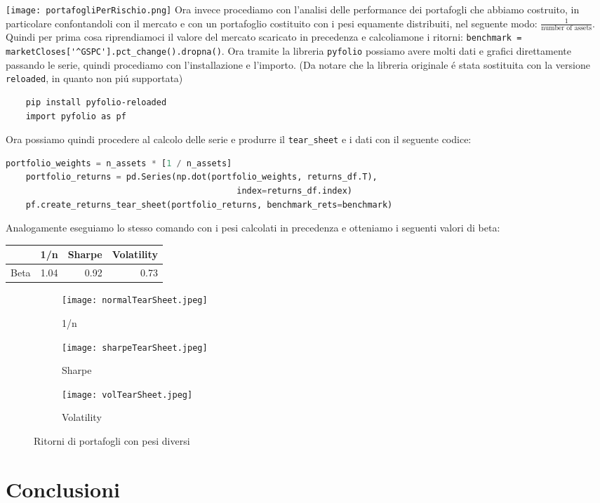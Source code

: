 \documentclass{report}
\begin{document}
\texttt{[image: portafogliPerRischio.png]}
Ora invece procediamo con l'analisi delle performance dei portafogli che abbiamo costruito, in particolare confontandoli con il mercato e con un portafoglio costituito con i pesi equamente distribuiti, nel seguente modo:  \(\frac{1}{\text{number of assets}}\). Quindi per prima cosa riprendiamoci il valore del mercato scaricato in precedenza e calcoliamone i ritorni: \lstinline{benchmark = marketCloses['^GSPC'].pct_change().dropna()}. Ora tramite la libreria \lstinline{pyfolio} possiamo avere molti dati e grafici direttamente passando le serie, quindi procediamo con l'installazione e l'importo. (Da notare che la libreria originale é stata sostituita con la versione \lstinline{reloaded}, in quanto non piú supportata)
\begin{lstlisting}
    pip install pyfolio-reloaded
    import pyfolio as pf
\end{lstlisting}
Ora possiamo quindi procedere al calcolo delle serie e produrre il \lstinline{tear_sheet} e i dati con il seguente codice:
\begin{lstlisting}[language=python]
    portfolio_weights = n_assets * [1 / n_assets]
    portfolio_returns = pd.Series(np.dot(portfolio_weights, returns_df.T),
                                              index=returns_df.index)
    pf.create_returns_tear_sheet(portfolio_returns, benchmark_rets=benchmark)
\end{lstlisting}
 Analogamente eseguiamo lo stesso comando con i pesi calcolati in precedenza
 e otteniamo i seguenti valori di beta:

\begin{tabular}{lrrr}
\toprule
{} &     1/n &     Sharpe &      Volatility \\
\midrule
Beta &  1.04 &  0.92 &  0.73 \\

\bottomrule
\end{tabular}

\begin{figure}[h]

\begin{subfigure}{0.5\textwidth}
\texttt{[image: normalTearSheet.jpeg]} 
\caption{1/n}
\label{fig:subim1}
\end{subfigure}
\begin{subfigure}{0.5\textwidth}
\texttt{[image: sharpeTearSheet.jpeg]}
\caption{Sharpe}
\label{fig:subim2}
\end{subfigure}
\begin{subfigure}{0.5\textwidth}
\texttt{[image: volTearSheet.jpeg]}
\caption{Volatility}
\label{fig:subim3}
\end{subfigure}

\caption{Ritorni di portafogli con pesi diversi}
\label{fig:image2}
\end{figure}

\chapter{Conclusioni}
\tableofcontents
\end{document}

